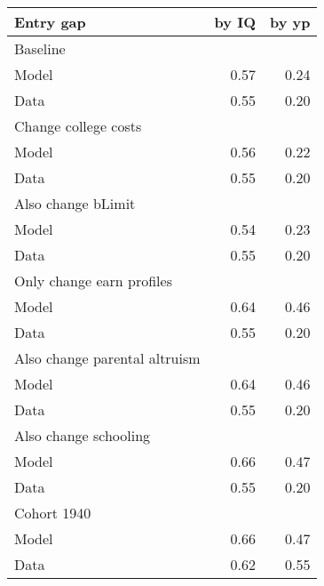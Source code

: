 \begin{tabular}{lrr}
\hline
Entry gap & by IQ  & by yp  \\
\hline
Baseline &   &   \\
Model & 0.57  & 0.24  \\
Data & 0.55  & 0.20  \\
Change college costs &   &   \\
Model & 0.56  & 0.22  \\
Data & 0.55  & 0.20  \\
Also change bLimit &   &   \\
Model & 0.54  & 0.23  \\
Data & 0.55  & 0.20  \\
Only change earn profiles &   &   \\
Model & 0.64  & 0.46  \\
Data & 0.55  & 0.20  \\
Also change parental altruism &   &   \\
Model & 0.64  & 0.46  \\
Data & 0.55  & 0.20  \\
Also change schooling &   &   \\
Model & 0.66  & 0.47  \\
Data & 0.55  & 0.20  \\
Cohort 1940 &   &   \\
Model & 0.66  & 0.47  \\
Data & 0.62  & 0.55  \\
\hline
\end{tabular}%
